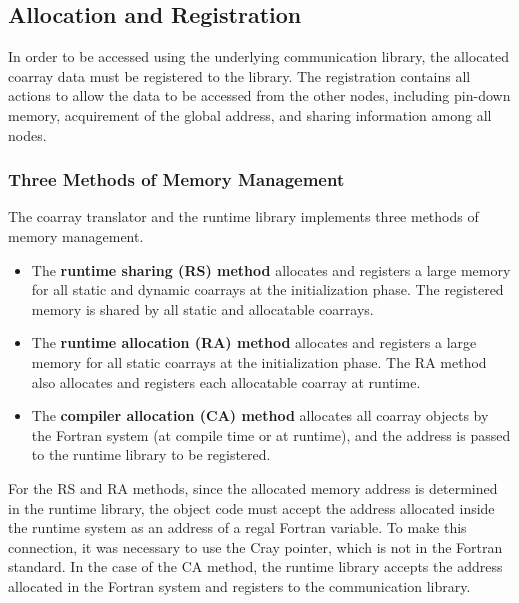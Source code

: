 \subsection{Allocation and Registration}\label{sec:alloc}

In order to be accessed using the underlying communication library,
the allocated coarray data must be registered to the library.
The registration contains all actions to allow the data to be accessed 
from the other nodes, including pin-down memory, acquirement of the global address,
and sharing information among all nodes.

\subsubsection{Three Methods of Memory Management}

The coarray translator and the runtime library implements three methods of
memory management.
\begin{itemize}
\item
The {\bf runtime sharing (RS) method} allocates and registers a large memory 
for all static and dynamic coarrays at the initialization phase.
The registered memory is shared by all static and allocatable coarrays. 

\item
The {\bf runtime allocation (RA) method} allocates and registers a large memory
for all static coarrays at the initialization phase.
The RA method also allocates and registers each allocatable coarray at runtime.

\item
The {\bf compiler allocation (CA) method} allocates all coarray objects by 
the Fortran system (at compile time or at runtime), and the address is 
passed to the runtime library to be registered.
\end{itemize}

For the RS and RA methods, 
since the allocated memory address is determined in the runtime library, 
the object code must accept the address allocated 
inside the runtime system as an address of a regal Fortran variable.
To make this connection, it was necessary to use the Cray pointer, which is not 
in the Fortran standard.
In the case of the CA method, the runtime library accepts the address allocated
in the Fortran system and registers to the communication library.

